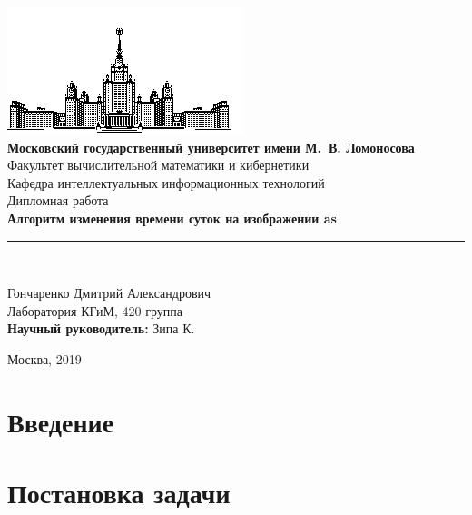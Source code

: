 \documentclass[11pt,a4paper]{extarticle}
\begin{document}
\begin{titlepage}
	\begin{centering}
		\includegraphics{img/msu}\\
		\large{
			\textbf{Московский государственный университет имени М.\ В. Ломоносова}\\
			Факультет вычислительной математики и кибернетики\\
			Кафедра интеллектуальных информационных технологий\\[4cm]
		}
		\Large{
			Дипломная работа\\[0.5cm]
		}
		\Large{
			\textbf{Алгоритм изменения времени суток на изображении
				as
			}\\
		}
		\rule[0.3cm]{14cm}{0.02cm}\\[3cm]
	\end{centering}
	\begin{flushright}
		\large{
			Гончаренко Дмитрий Александрович\\
			Лаборатория КГиМ, 420 группа \\
			
			\textbf{Научный руководитель:} Зипа К.\\
		}
	\end{flushright}
	\begin{center}
		\vfill
		\large{
			Москва, 2019
		}
	\end{center}
\end{titlepage}

\begin{abstract}

\end{abstract}

\newpage
\tableofcontents
\newpage

\section{Введение}

\section{Постановка задачи}
\end{document}
